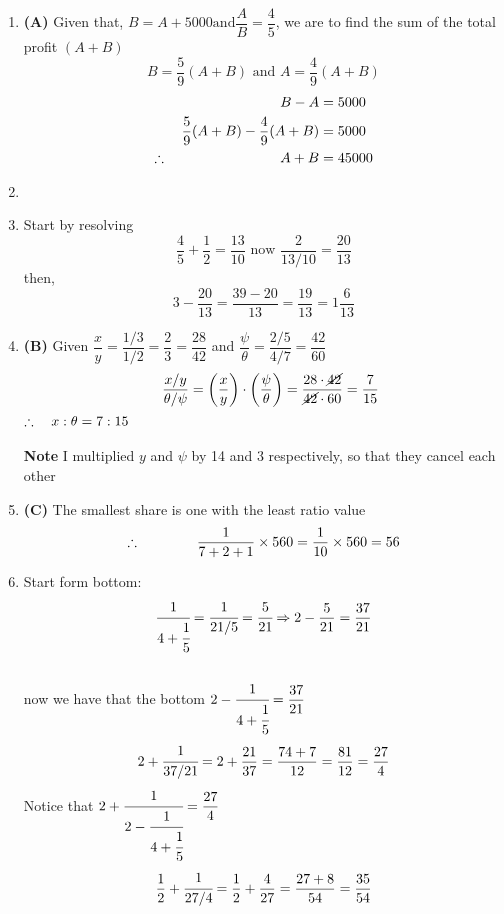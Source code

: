 \begin{multicols}{2}
\begin{enumerate}[label={\textbf{\arabic*.}}]
\begin{enumerate}[label={\arabic*.}]
    \item \textbf{(A) } Given that, \(B = A + 5000 \text{and} \dfrac{A}{B} = \dfrac{4}{5}\), we are to find the sum 
    of the total profit $\left( A + B\right)$
    \[B = \dfrac{5}{9}(A + B) \text{ and } A = \dfrac{4}{9}(A + B)\]
    \begin{align*}
        B - A &= 5000 \\
        \dfrac{5}{9}(A + B) - \dfrac{4}{9}(A + B) &= 5000 \\
        \therefore \hspace{80px}  A + B &= 45000
    \end{align*}
    \item 
    \item Start by resolving \\
    \[ \dfrac{4}{5} + \dfrac{1}{2} = \dfrac{13}{10}\text{ now }  \dfrac{2}{13/10} = \dfrac{20}{13} \] 
    then, \\
    \[3 - \dfrac{20}{13} = \dfrac{39 - 20}{13} = \dfrac{19}{13} = 1\dfrac{6}{13} \]
    \item \textbf{(B)} Given $\dfrac{x}{y} = \dfrac{1/3}{1/2} = \dfrac{2}{3} = \dfrac{28}{42}$ and $\dfrac{\psi}{\theta} = \dfrac{2/5}{4/7} = \dfrac{42}{60}$ \\
    \[ \hspace{10px} \dfrac{x/y}{\theta / \psi} = \left(\dfrac{x}{y}\right) \cdot \left(\dfrac{\psi}{\theta}\right) = \dfrac{28 \cdot \cancel{42}}{\cancel{42} \cdot 60} = \dfrac{7}{15}  \]
    \(\therefore \hspace{10px} x:\theta = 7:15\) \\\\
    \textbf{Note} I multiplied $y$ and $\psi$ by 14 and 3 respectively, so that they cancel each other

    \item \textbf{(C)} The smallest share is one with the least ratio value \\
    \[ \therefore \hspace{40px} \dfrac{1}{7+2+1} \times 560 = \dfrac{1}{10} \times 560 = 56\]
    \item Start form bottom: \\
    \[\cfrac{1}{4 + \cfrac{1}{5}}  = \cfrac{1}{ 21/5} = \cfrac{5}{21} \Rightarrow 2 - \dfrac{5}{21} = \dfrac{37}{21}\] \\
    now we have that the bottom \(2 - \cfrac{1}{4 + \cfrac{1}{5}} = \dfrac{37}{21}\) \vspace{3pt}
    \[2 + \cfrac{ 1 }{37/21} = 2 + \dfrac{21}{37}  = \dfrac{74 + 7}{12} = \dfrac{81}{12} = \dfrac{27}{4}\]
    Notice that \(2 + \cfrac{1}{2 - \cfrac{1}{4 + \cfrac{1}{5}}} = \dfrac{27}{4}\) \vspace{3pt}
    \[\dfrac{1}{2} + \cfrac{1}{27/4} = \dfrac{1}{2} + \dfrac{4}{27} = \dfrac{27 + 8}{54} = \dfrac{35}{54} \]


\end{enumerate}
\end{enumerate}
\end{multicols}
